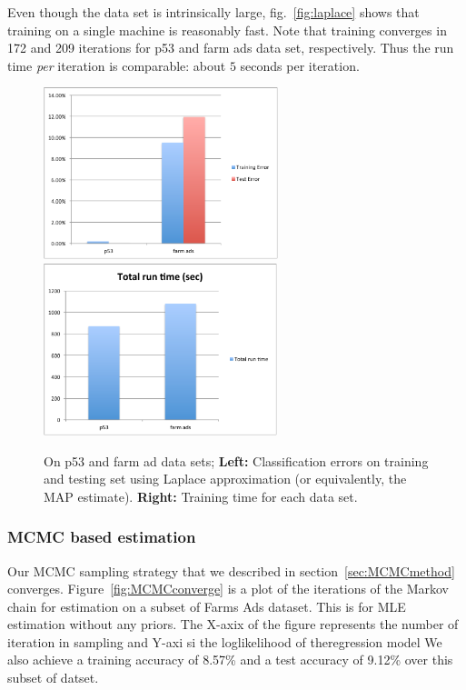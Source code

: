 Even though the data set is intrinsically large, fig.~\ref{fig:laplace} shows
that training on a single machine is reasonably fast. Note that training
converges in 172 and 209 iterations for p53 and farm ads data set,
respectively. Thus the run time {\em per} iteration is comparable: about $5$
seconds per iteration.


\begin{figure}[t]
\label{fig:laplace}
\centering
\includegraphics[height=5.0cm]{../../results/classificaiton_errors.pdf}
\includegraphics[height=5.0cm]{../../results/runtime.pdf}

\caption{\small On p53 and farm ad data sets; {\bf Left:} Classification errors on
training and testing set using Laplace approximation (or equivalently, the
MAP estimate). {\bf Right:} Training time for each data set. }

\label{graphlab}
\end{figure}

\subsubsection{MCMC based estimation}
Our MCMC sampling strategy that we described in section~\ref{sec:MCMCmethod}
converges. Figure~\ref{fig:MCMCconverge} is a plot of the iterations of the Markov 
chain for estimation on a subset of Farms Ads dataset. This is for MLE
estimation without any priors. The X-axix of the figure represents the number of
iteration in sampling and Y-axi si the loglikelihood of theregression model We
also achieve a training accuracy of 8.57\% and a test accuracy of 9.12\% over 
this subset of datset. 

